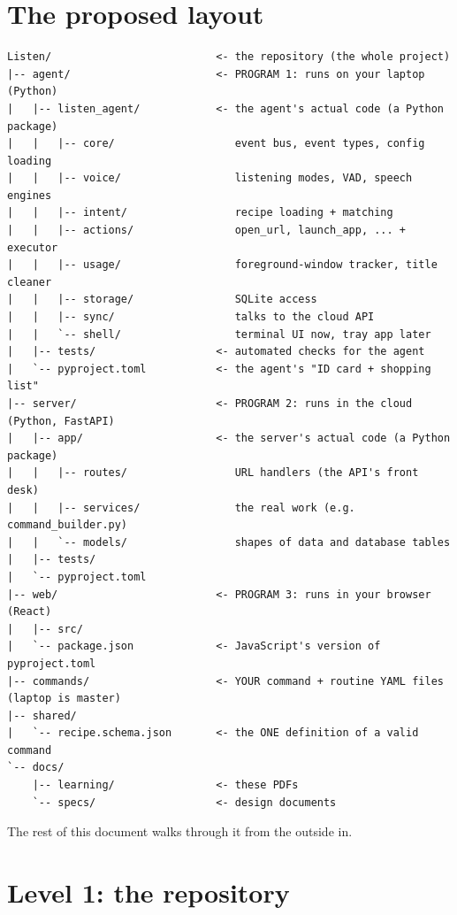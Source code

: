 \documentclass[11pt,a4paper]{article}
\begin{document}
\section{The proposed layout}

\begin{lstlisting}
Listen/                          <- the repository (the whole project)
|-- agent/                       <- PROGRAM 1: runs on your laptop (Python)
|   |-- listen_agent/            <- the agent's actual code (a Python package)
|   |   |-- core/                   event bus, event types, config loading
|   |   |-- voice/                  listening modes, VAD, speech engines
|   |   |-- intent/                 recipe loading + matching
|   |   |-- actions/                open_url, launch_app, ... + executor
|   |   |-- usage/                  foreground-window tracker, title cleaner
|   |   |-- storage/                SQLite access
|   |   |-- sync/                   talks to the cloud API
|   |   `-- shell/                  terminal UI now, tray app later
|   |-- tests/                   <- automated checks for the agent
|   `-- pyproject.toml           <- the agent's "ID card + shopping list"
|-- server/                      <- PROGRAM 2: runs in the cloud (Python, FastAPI)
|   |-- app/                     <- the server's actual code (a Python package)
|   |   |-- routes/                 URL handlers (the API's front desk)
|   |   |-- services/               the real work (e.g. command_builder.py)
|   |   `-- models/                 shapes of data and database tables
|   |-- tests/
|   `-- pyproject.toml
|-- web/                         <- PROGRAM 3: runs in your browser (React)
|   |-- src/
|   `-- package.json             <- JavaScript's version of pyproject.toml
|-- commands/                    <- YOUR command + routine YAML files (laptop is master)
|-- shared/
|   `-- recipe.schema.json       <- the ONE definition of a valid command
`-- docs/
    |-- learning/                <- these PDFs
    `-- specs/                   <- design documents
\end{lstlisting}

\noindent The rest of this document walks through it from the outside in.

\section{Level 1: the repository}
\end{document}
